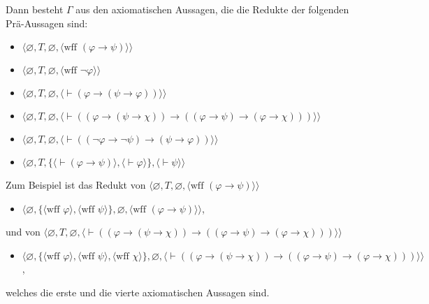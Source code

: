 \noindent Dann besteht $\Gamma$ aus den axiomatischen Aussagen, die die Redukte der folgenden Prä-Aussagen sind:
    \begin{itemize}
      \item[] $\langle\varnothing,T,\varnothing,
               \langle \mbox{wff\ }(\varphi\to\psi)\rangle\rangle$
      \item[] $\langle\varnothing,T,\varnothing,
               \langle \mbox{wff\ }\lnot\varphi\rangle\rangle$
      \item[] $\langle\varnothing,T,\varnothing,
               \langle \vdash(\varphi\to(\psi\to\varphi))
               \rangle\rangle$
      \item[] $\langle\varnothing,T,
               \varnothing,
               \langle \vdash((\varphi\to(\psi\to\chi))\to
               ((\varphi\to\psi)\to(\varphi\to\chi)))
               \rangle\rangle$
      \item[] $\langle\varnothing,T,
               \varnothing,
               \langle \vdash((\lnot\varphi\to\lnot\psi)\to
               (\psi\to\varphi))\rangle\rangle$
      \item[] $\langle\varnothing,T,
               \{\langle\vdash(\varphi\to\psi)\rangle,
                 \langle\vdash\varphi\rangle\},
               \langle\vdash\psi\rangle\rangle$
    \end{itemize}

\noindent Zum Beispiel ist das Redukt von $\langle\varnothing,T,\varnothing, \langle \mbox{wff\ }(\varphi\to\psi)\rangle\rangle$
\begin{itemize}
\item[] $\langle\varnothing,
\{\langle \mbox{wff\ } \varphi\rangle,
             \langle \mbox{wff\ } \psi\rangle\},
             \varnothing,
               \langle \mbox{wff\ }(\varphi\to\psi)\rangle\rangle$,
\end{itemize}

und von $\langle\varnothing,T,\varnothing,\langle \vdash((\varphi\to(\psi\to\chi))\to((\varphi\to\psi)\to(\varphi\to\chi)))
\rangle\rangle$
\begin{itemize}
\item[] $\langle\varnothing,\{\langle \mbox{wff\ } \varphi\rangle,
\langle \mbox{wff\ } \psi\rangle, \langle \mbox{wff\ } \chi\rangle\},\varnothing,\langle \vdash((\varphi\to(\psi\to\chi))\to((\varphi\to\psi)\to(\varphi\to\chi)))
\rangle\rangle$,
\end{itemize}
welches die erste und die vierte axiomatischen Aussagen sind.

